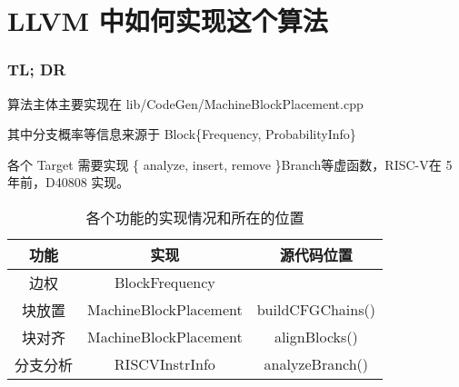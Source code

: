\section{LLVM 中如何实现这个算法}


\begin{frame}
    \frametitle{TL; DR}

    算法主体主要实现在 lib/CodeGen/MachineBlockPlacement.cpp

    \vspace{1.5em}

    其中分支概率等信息来源于 Block\{Frequency, ProbabilityInfo\}

    \vspace{1.5em}

    各个 Target 需要实现 \{ analyze, insert, remove \}Branch等虚函数，RISC-V在 5 年前，D40808
    \cite{llvmriscvimplbranchanalysis2022}实现。
    \begin{table}
        \begin{tabular}{ccc}
            \toprule
            功能     & 实现                  & 源代码位置                                                                         \\
            \midrule
            边权     & BlockFrequency        & \cite{llvmblockfreqinfoimpl2022}                                                   \\
            块放置   & MachineBlockPlacement & buildCFGChains()\cite{llvmmachineblockplacement2022}                               \\
            块对齐   & MachineBlockPlacement & alignBlocks()\cite{llvmmachineblockplacement2022}                                  \\
            分支分析 & RISCVInstrInfo        & analyzeBranch()\cite{llvmriscvinstrinfo2022}\cite{llvmriscvimplbranchanalysis2022} \\
            \bottomrule
        \end{tabular}
        \caption{各个功能的实现情况和所在的位置}
    \end{table}

\end{frame}
